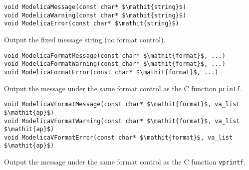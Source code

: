 \begin{functiondefinition*}\label{modelica:ModelicaMessage-et-al}%
\begin{synopsis}[C]\begin{lstlisting}
void ModelicaMessage(const char* $\mathit{string}$)
void ModelicaWarning(const char* $\mathit{string}$)
void ModelicaError(const char* $\mathit{string}$)
\end{lstlisting}\end{synopsis}
\begin{semantics}
Output the fixed message string (no format control).
\end{semantics}
\end{functiondefinition*}

\begin{functiondefinition*}\label{modelica:ModelicaFormatMessage-et-al}%
\begin{synopsis}[C]
\begin{lstlisting}
void ModelicaFormatMessage(const char* $\mathit{format}$, ...)
void ModelicaFormatWarning(const char* $\mathit{format}$, ...)
void ModelicaFormatError(const char* $\mathit{format}$, ...)
\end{lstlisting}\end{synopsis}
\begin{semantics}
Output the message under the same format control as the C function \lstinline[language=C]!printf!.
\end{semantics}
\end{functiondefinition*}

\begin{functiondefinition*}\label{modelica:ModelicaVFormatMessage-et-al}%
\begin{synopsis}[C]\begin{lstlisting}
void ModelicaVFormatMessage(const char* $\mathit{format}$, va_list $\mathit{ap}$)
void ModelicaVFormatWarning(const char* $\mathit{format}$, va_list $\mathit{ap}$)
void ModelicaVFormatError(const char* $\mathit{format}$, va_list $\mathit{ap}$)
\end{lstlisting}\end{synopsis}
\begin{semantics}
Output the message under the same format control as the C function \lstinline[language=C]!vprintf!.
\end{semantics}
\end{functiondefinition*}

